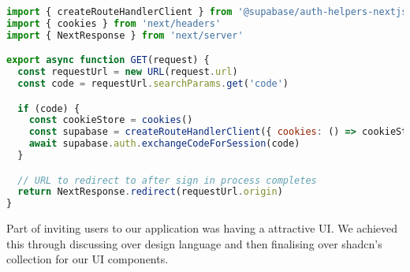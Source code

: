 \begin{lstlisting}[language=javascript, caption={Callback Route Handler}]
import { createRouteHandlerClient } from '@supabase/auth-helpers-nextjs'
import { cookies } from 'next/headers'
import { NextResponse } from 'next/server'

export async function GET(request) {
  const requestUrl = new URL(request.url)
  const code = requestUrl.searchParams.get('code')

  if (code) {
    const cookieStore = cookies()
    const supabase = createRouteHandlerClient({ cookies: () => cookieStore })
    await supabase.auth.exchangeCodeForSession(code)
  }

  // URL to redirect to after sign in process completes
  return NextResponse.redirect(requestUrl.origin)
}
\end{lstlisting}

Part of inviting users to our application was having a attractive UI. We achieved this
through discussing over design language and then finalising over shadcn's collection for our UI components.
